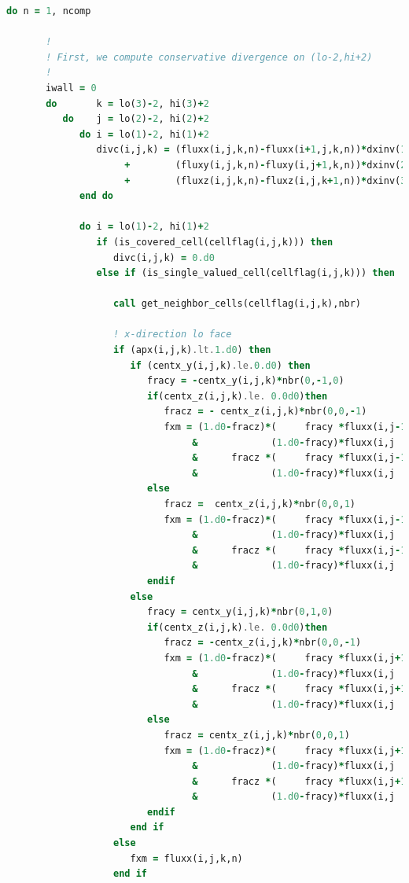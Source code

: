 \begin{lstlisting}[language=Fortran]
    do n = 1, ncomp

       !
       ! First, we compute conservative divergence on (lo-2,hi+2)
       !
       iwall = 0
       do       k = lo(3)-2, hi(3)+2
          do    j = lo(2)-2, hi(2)+2
             do i = lo(1)-2, hi(1)+2
                divc(i,j,k) = (fluxx(i,j,k,n)-fluxx(i+1,j,k,n))*dxinv(1) &
                     +        (fluxy(i,j,k,n)-fluxy(i,j+1,k,n))*dxinv(2) &
                     +        (fluxz(i,j,k,n)-fluxz(i,j,k+1,n))*dxinv(3)
             end do

             do i = lo(1)-2, hi(1)+2
                if (is_covered_cell(cellflag(i,j,k))) then
                   divc(i,j,k) = 0.d0
                else if (is_single_valued_cell(cellflag(i,j,k))) then

                   call get_neighbor_cells(cellflag(i,j,k),nbr)

                   ! x-direction lo face
                   if (apx(i,j,k).lt.1.d0) then
                      if (centx_y(i,j,k).le.0.d0) then
                         fracy = -centx_y(i,j,k)*nbr(0,-1,0)
                         if(centx_z(i,j,k).le. 0.0d0)then
                            fracz = - centx_z(i,j,k)*nbr(0,0,-1)
                            fxm = (1.d0-fracz)*(     fracy *fluxx(i,j-1,k  ,n)  + &
                                 &             (1.d0-fracy)*fluxx(i,j  ,k  ,n)) + &
                                 &      fracz *(     fracy *fluxx(i,j-1,k-1,n)  + &
                                 &             (1.d0-fracy)*fluxx(i,j  ,k-1,n))
                         else
                            fracz =  centx_z(i,j,k)*nbr(0,0,1)
                            fxm = (1.d0-fracz)*(     fracy *fluxx(i,j-1,k  ,n)  + &
                                 &             (1.d0-fracy)*fluxx(i,j  ,k  ,n)) + &
                                 &      fracz *(     fracy *fluxx(i,j-1,k+1,n)  + &
                                 &             (1.d0-fracy)*fluxx(i,j  ,k+1,n))
                         endif
                      else
                         fracy = centx_y(i,j,k)*nbr(0,1,0)
                         if(centx_z(i,j,k).le. 0.0d0)then
                            fracz = -centx_z(i,j,k)*nbr(0,0,-1)
                            fxm = (1.d0-fracz)*(     fracy *fluxx(i,j+1,k  ,n)  + &
                                 &             (1.d0-fracy)*fluxx(i,j  ,k  ,n)) + &
                                 &      fracz *(     fracy *fluxx(i,j+1,k-1,n)  + &
                                 &             (1.d0-fracy)*fluxx(i,j  ,k-1,n))
                         else
                            fracz = centx_z(i,j,k)*nbr(0,0,1)
                            fxm = (1.d0-fracz)*(     fracy *fluxx(i,j+1,k  ,n)  + &
                                 &             (1.d0-fracy)*fluxx(i,j  ,k  ,n)) + &
                                 &      fracz *(     fracy *fluxx(i,j+1,k+1,n)  + &
                                 &             (1.d0-fracy)*fluxx(i,j  ,k+1,n))
                         endif
                      end if
                   else
                      fxm = fluxx(i,j,k,n)
                   end if


\end{lstlisting}
